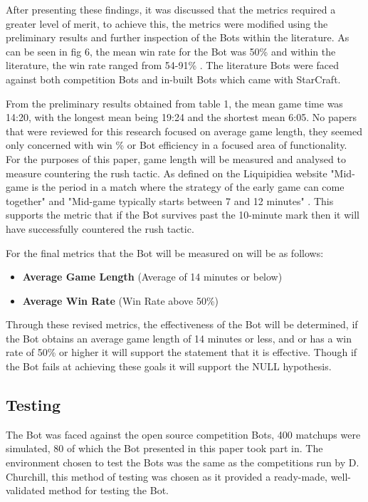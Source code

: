 \documentclass[journal]{IEEEtran}
\begin{document}
	After presenting these findings, it was discussed that the metrics required a greater level of merit, to achieve this, the metrics were modified using the preliminary results and further inspection of the Bots within the literature. As can be seen in fig 6, the mean win rate for the Bot was 50\% and within the literature, the win rate ranged from 54-91\% \cite{ELGoal,Swen,OnlineEvo,GoalDriven}. The literature Bots were faced against both competition Bots and in-built Bots which came with StarCraft.
	
	From the preliminary results obtained from table 1, the mean game time was 14:20, with the longest mean being 19:24 and the shortest mean 6:05. No papers that were reviewed for this research focused on average game length, they seemed only concerned with win \% or Bot efficiency in a focused area of functionality. For the purposes of this paper, game length will be measured and analysed to measure countering the rush tactic. As defined on the Liquipidiea website "Mid-game is the period in a match where the strategy of the early game can come together" and "Mid-game typically starts between 7 and 12 minutes" \cite{Liqui}. This supports the metric that if the Bot survives past the 10-minute mark then it will have successfully countered the rush tactic. 
	\newline
	
	For the final metrics that the Bot will be measured on will be as follows:
	\begin{itemize}
		\item \textbf{Average Game Length} (Average of 14 minutes or below)
		\item \textbf{Average Win Rate} (Win Rate above 50\%)
	\end{itemize}
	
	Through these revised metrics, the effectiveness of the Bot will be determined, if the Bot obtains an average game length of 14 minutes or less, and or has a win rate of 50\% or higher it will support the statement that it is effective. Though if the Bot fails at achieving these goals it will support the NULL hypothesis.
	
	\subsection{Testing}
	The Bot was faced against the open source competition Bots, 400 matchups were simulated, 80 of which the Bot presented in this paper took part in. The environment chosen to test the Bots was the same as the competitions run by D. Churchill, this method of testing was chosen as it provided a ready-made, well-validated method for testing the Bot.
	
\end{document}
